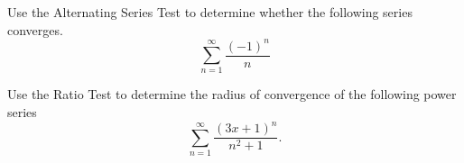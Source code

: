 \documentclass[11pt]{exam}
\begin{document}
\begin{questions}

\newpage
\addpoints 
\question[1] Use the Alternating Series Test to determine whether the following series converges. 
\begin{equation*}
\sum_{n=1}^{\infty} \frac{(-1)^n}{n}
\end{equation*}


\newpage
\addpoints
\question[2] Use the Ratio Test to determine the radius of convergence of the following power series
\begin{equation*}
\sum_{n=1}^{\infty} \frac{(3x+1)^n}{n^2+1}.
\end{equation*}

\end{questions}
\end{document}
